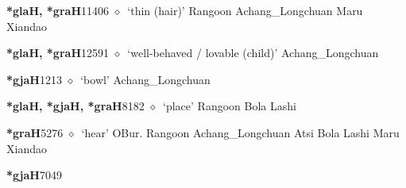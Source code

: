   \begin{list}{}{\leftmargin=1.5em \itemindent=-1.5em}
  \item {\footnotesize \textbf{*glaH, *graH}}{\tiny 11406}
         $\diamond$~`thin (hair)'
         Rangoon 
\hspace{1ex}
         Achang\_Longchuan 
\hspace{1ex}
         Maru 
\hspace{1ex}
         Xiandao 
  \item {\footnotesize \textbf{*glaH, *graH}}{\tiny 12591}
\hspace{1ex}
         $\diamond$~`well-behaved / lovable (child)'
         Achang\_Longchuan 
  \item {\footnotesize \textbf{*gjaH}}{\tiny 1213}
\hspace{1ex}
         $\diamond$~`bowl'
         Achang\_Longchuan 
  \item {\footnotesize \textbf{*glaH, *gjaH, *graH}}{\tiny 8182}
\hspace{1ex}
         $\diamond$~`place'
         Rangoon 
\hspace{1ex}
         Bola 
\hspace{1ex}
         Lashi 
  \item {\footnotesize \textbf{*graH}}{\tiny 5276}
\hspace{1ex}
         $\diamond$~`hear'
         OBur. 
\hspace{1ex}
         Rangoon 
\hspace{1ex}
         Achang\_Longchuan 
\hspace{1ex}
         Atsi 
\hspace{1ex}
         Bola 
\hspace{1ex}
         Lashi 
\hspace{1ex}
         Maru 
\hspace{1ex}
         Xiandao 
  \item {\footnotesize \textbf{*gjaH}}{\tiny 7049}
\hspace{1ex}

\end{list}
